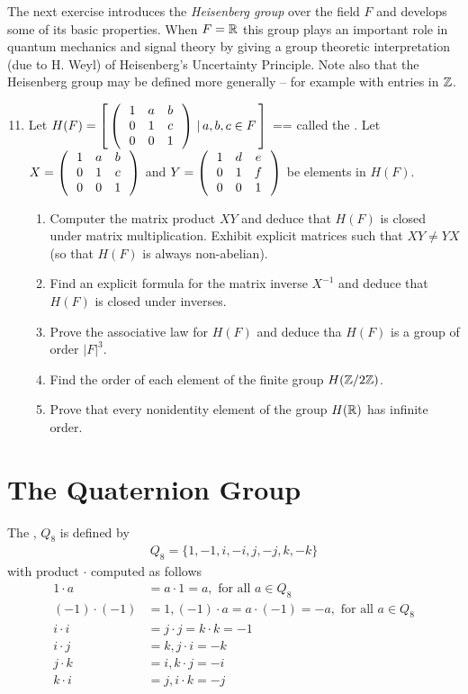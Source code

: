\documentclass[10pt,a4paper]{report}
\begin{document}
The next exercise introduces the \textit{Heisenberg group} over the field $F$ and develops some of its basic properties.  When $F = \mathbb{R}$ this group plays an important role in quantum mechanics and signal theory by giving a group theoretic interpretation (due to H. Weyl) of Heisenberg's Uncertainty Principle.  Note also that the Heisenberg group may be defined more generally -- for example with entries in $\mathbb{Z}$.

\begin{enumerate}
	\setcounter{enumi}{10}
	\item Let $H(F) = \left [\, \left (\,  \begin{array}{c c c} 1&a&b \\ 0 & 1 & c \\ 0 & 0 & 1 \end{array}  \,\right ) \,|\,a,b,c \in F \,\right ]$ == called the .  Let $X=\left (\,  \begin{array}{c c c} 1&a&b \\ 0 & 1 & c \\ 0 & 0 & 1 \end{array}  \,\right )$ and $Y = \left (\,  \begin{array}{c c c} 1&d&e \\ 0 & 1 & f \\ 0 & 0 & 1 \end{array}  \,\right )$ be elements in $H(F)$.
	\begin{enumerate}
		\item Computer the matrix product $XY$ and deduce that $H(F)$ is closed under matrix multiplication.  Exhibit explicit matrices such that $XY\ne YX$ (so that $H(F)$ is always non-abelian).
		
		\item Find an explicit formula for the matrix inverse $X^{-1}$ and deduce that $H(F)$ is closed under inverses.
		
		\item Prove the associative law for $H(F)$ and deduce tha $H(F)$ is a group of order $|F|^3$.
		
		\item Find the order of each element of the finite group $H(\mathbb{Z}/2\mathbb{Z})$.
		
		\item Prove that every nonidentity element of the group $H(\mathbb{R})$ has infinite order.
	\end{enumerate}
\end{enumerate}

\section{The Quaternion Group}

\begin{definition}The , $Q_8$ is defined by 
\begin{align*}
	Q_8=\{1,-1,i,-i,j,-j, k,-k\}
\end{align*}with product $\cdot$ computed as follows
\begin{align*}
	1\cdot a&=a\cdot 1 =a, \text{ for all }a \in Q_8\\
	(-1)\cdot(-1) &= 1, (-1)\cdot a=a \cdot (-1) = -a, \text{ for all } a \in Q_8 \\
	i \cdot i &= j \cdot j = k \cdot k = -1 \\
	i \cdot j &= k, j \cdot i = -k \\
	j \cdot k &= i, k \cdot j = -i \\
	k \cdot i &= j, i \cdot k = -j
\end{align*}

\end{definition}
\end{document}
